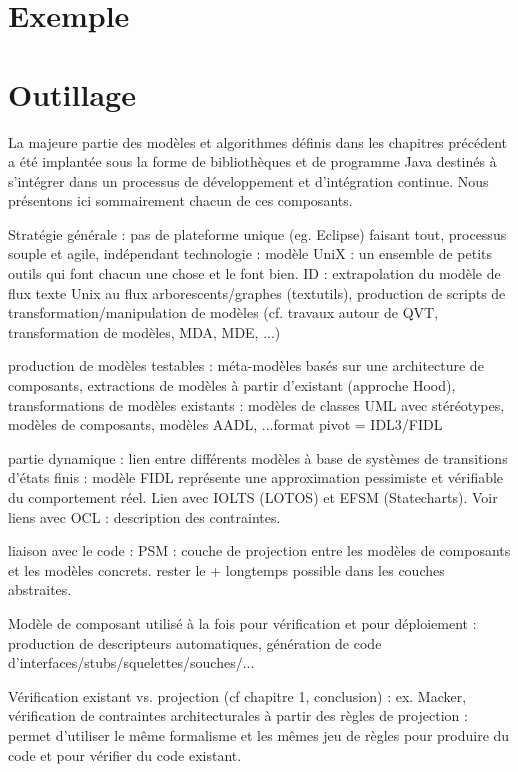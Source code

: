\section{Exemple}



\section{Outillage}

La majeure partie des mod\`eles et algorithmes d\'efinis dans les
chapitres pr\'ec\'edent a \'et\'e implant\'ee sous la forme de
biblioth\`eques et de programme \textsf{Java} destin\'es \`a
s'int\'egrer dans un processus de d\'eveloppement et
d'int\'egration continue. Nous pr\'esentons ici sommairement chacun
de ces composants. 



Strat\'egie g\'en\'erale : pas de plateforme unique (eg. Eclipse)
faisant tout, processus souple et agile, ind\'ependant technologie :
mod\`ele UniX : un ensemble de petits outils qui font chacun une
chose et le font bien. ID : extrapolation du mod\`ele de flux texte
Unix au flux arborescents/graphes (textutils), production de scripts
de transformation/manipulation de mod\`eles (cf. travaux autour de
QVT, transformation de mod\`eles, MDA, MDE, ...)

production de mod\`eles testables : m\'eta-mod\`eles bas\'es sur
une architecture de composants, extractions de mod\`eles \`a partir
d'existant (approche Hood), transformations de mod\`eles existants :
mod\`eles de classes UML avec st\'er\'eotypes, mod\`eles de
composants, mod\`eles AADL, ...format pivot = IDL3/FIDL

partie dynamique : lien entre diff\'erents mod\`eles \`a base de
syst\`emes de transitions d'\'etats finis : mod\`ele FIDL
repr\'esente une approximation pessimiste et v\'erifiable du
comportement r\'eel.  Lien avec IOLTS (LOTOS) et EFSM
(Statecharts). Voir liens avec OCL : description des contraintes. 

liaison avec le code : PSM : couche de projection entre les mod\`eles
de composants et les mod\`eles concrets. rester le + longtemps
possible dans les couches abstraites. 

Mod\`ele de composant
utilis\'e \`a la fois pour v\'erification et pour d\'eploiement :
production de descripteurs automatiques, g\'en\'eration de code
d'interfaces/stubs/squelettes/souches/...

V\'erification existant vs. projection (cf chapitre 1, conclusion) :
ex. Macker, v\'erification de contraintes architecturales \`a partir
des r\`egles de projection : permet d'utiliser le m\^eme formalisme
et les m\^emes jeu de r\`egles pour produire du code et pour
v\'erifier du code existant. 

